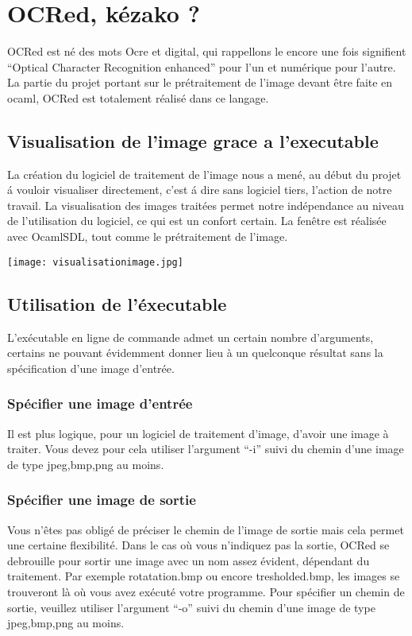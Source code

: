 \documentclass[a4paper,10pt]{report}
\begin{document}
\chapter{ OCRed, k\'ezako ? }
 OCRed est n\'e des mots Ocre et digital, qui rappellons le encore une fois
 signifient ``Optical Character Recognition enhanced'' pour l'un et
 num\'erique pour l'autre. La partie du projet portant sur le
 pr\'etraitement de l'image devant \^etre faite en ocaml, OCRed est
 totalement r\'ealis\'e dans ce langage.

\section{ Visualisation de l'image grace a l'executable }
 La cr\'eation du logiciel de traitement de l'image nous a men\'e, au
 d\'ebut du projet \'a vouloir visualiser directement, c'est \'a dire
 sans logiciel tiers, l'action de notre travail.
 La visualisation des images trait\'ees permet notre ind\'ependance
 au niveau de l'utilisation du logiciel, ce qui est un confort certain.
 La fen\^etre est r\'ealis\'ee avec OcamlSDL, tout comme le pr\'etraitement
 de l'image.

\begin{center}
	
	\texttt{[image: visualisationimage.jpg]}\\
\end{center}

\section{ Utilisation de l'\'executable }
 L'ex\'ecutable en ligne de commande admet un certain nombre d'arguments,
 certains ne pouvant \'evidemment donner lieu \`a un quelconque r\'esultat
 sans la sp\'ecification d'une image d'entr\'ee.
\subsection{ Sp\'ecifier une image d'entr\'ee }
 Il est plus logique, pour un logiciel de traitement d'image, d'avoir
 une image \`a traiter. Vous devez pour cela utiliser l'argument ``-i''
 suivi du chemin d'une image de type jpeg,bmp,png au moins.
\subsection{ Sp\'ecifier une image de sortie }
 Vous n'\^etes pas oblig\'e de pr\'eciser le chemin de l'image de sortie
 mais cela permet une certaine flexibilit\'e. Dans le cas o\`u vous
 n'indiquez pas la sortie, OCRed se debrouille pour sortir une image
 avec un nom assez \'evident, d\'ependant du traitement. Par exemple
 rotatation.bmp ou encore tresholded.bmp, les images se trouveront l\`a
 o\`u vous avez ex\'ecut\'e votre programme. Pour sp\'ecifier un chemin de
 sortie, veuillez utiliser l'argument ``-o'' suivi du chemin d'une image
de type jpeg,bmp,png au moins.
\end{document}
